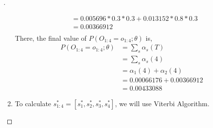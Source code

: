 \documentclass[a4paper, 12pt]{article}
\begin{document}
\begin{proof}[]
\begin{enumerate}[label={\color{blue}{\textbf{3.\arabic*})}}]
\begin{align*}
            &= 0.005696*0.3*0.3 + 0.013152*0.8*0.3\\
            &= 0.00366912\\
        \end{align*}
        There, the final value of $P(O_{1:4}=o_{1:4};\theta)$ is,
        \begin{align*}
            P(O_{1:4}=o_{1:4};\theta) &= \sum_s\alpha_s(T) \\
            &= \sum_s\alpha_s(4) \\
            &= \alpha_1(4) + \alpha_2(4) \\
            &= 0.00066176 + 0.00366912\\
            &= \bm{0.00433088}
        \end{align*}
        
        
    \item 
        To calculate $s^*_{1:4} = [s^*_{1},s^*_{2},s^*_{3},s^*_{4}]$, we will use Viterbi Algorithm.
        

\end{enumerate}
\end{proof}
\end{document}
